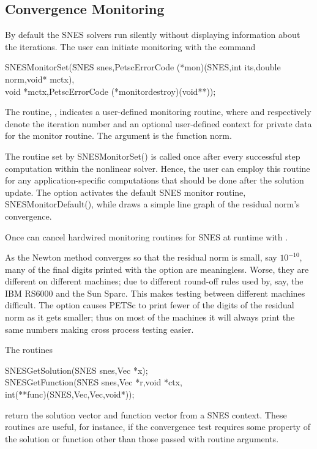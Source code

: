 \subsection{Convergence Monitoring}
\label{sec_snesmonitor}

By default the SNES solvers run silently without displaying information
about the iterations. The user can initiate monitoring with the
command
\begin{tabbing}
  SNESMonitorSet(\=SNES snes,PetscErrorCode (*mon)(SNES,int its,double norm,void* mctx),\\
                 \>        void *mctx,PetscErrorCode (*monitordestroy)(void**));
\end{tabbing}
The routine, , indicates a user-defined monitoring routine,
where  and  respectively denote the iteration
number and an optional user-defined context for private data for the
monitor routine.  The argument  is the function norm.

The routine set by SNESMonitorSet() is called once after every
successful step computation within the nonlinear solver.  Hence, the
user can employ this routine for any application-specific computations
that should be done after the solution update. The option
  activates the default
SNES monitor routine, SNESMonitorDefault(), 
while   draws
a simple line graph of the residual norm's convergence.

Once can cancel hardwired monitoring routines for SNES at runtime with 
. 

As the Newton method converges so that the residual norm is small,
say $ 10^{-10} $, many of the final digits printed with the 
option are meaningless. Worse, they are different on different 
machines; due to different round-off rules used by, say, the IBM RS6000
and the Sun Sparc. This makes testing between different machines
difficult. The option  
causes PETSc to print fewer of the digits of the residual norm 
as it gets smaller; thus on most of the machines it will always
print the same numbers making cross process testing easier.

The routines
\begin{tabbing}
  SNESGetSolution(SNES snes,Vec *x);\\
  SNESGetFunction(\=SNES snes,Vec *r,void *ctx,\\
                  \>        int(**func)(SNES,Vec,Vec,void*));
\end{tabbing}
return the solution vector and function vector from a SNES context. 
These routines are useful, for instance, if the convergence test requires 
some property of the solution or function other than those passed with
routine arguments.

